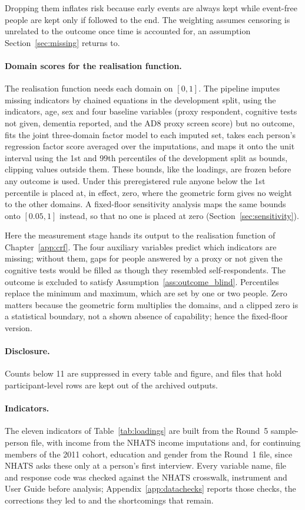 Dropping them inflates risk because early events are always kept while event-free people are kept only if followed to the end. The weighting assumes censoring is unrelated to the outcome once time is accounted for, an assumption Section~\ref{sec:missing} returns to.

\paragraph{Domain scores for the realisation function.} The realisation function needs each domain on $[0,1]$. The pipeline imputes missing indicators by chained equations in the development split, using the indicators, age, sex and four baseline variables (proxy respondent, cognitive tests not given, dementia reported, and the AD8 proxy screen score) but no outcome, fits the joint three-domain factor model to each imputed set, takes each person's regression factor score averaged over the imputations, and maps it onto the unit interval using the 1st and 99th percentiles of the development split as bounds, clipping values outside them. These bounds, like the loadings, are frozen before any outcome is used. Under this preregistered rule anyone below the 1st percentile is placed at, in effect, zero, where the geometric form gives no weight to the other domains. A fixed-floor sensitivity analysis maps the same bounds onto $[0.05,1]$ instead, so that no one is placed at zero (Section~\ref{sec:sensitivity}).

Here the measurement stage hands its output to the realisation function of Chapter~\ref{app:crf}. The four auxiliary variables predict which indicators are missing; without them, gaps for people answered by a proxy or not given the cognitive tests would be filled as though they resembled self-respondents. The outcome is excluded to satisfy Assumption~\ref{ass:outcome_blind}. Percentiles replace the minimum and maximum, which are set by one or two people. Zero matters because the geometric form multiplies the domains, and a clipped zero is a statistical boundary, not a shown absence of capability; hence the fixed-floor version.

\paragraph{Disclosure.} Counts below 11 are suppressed in every table and figure, and files that hold participant-level rows are kept out of the archived outputs.

\paragraph{Indicators.} The eleven indicators of Table~\ref{tab:loadings} are built from the Round~5 sample-person file, with income from the NHATS income imputations and, for continuing members of the 2011 cohort, education and gender from the Round~1 file, since NHATS asks these only at a person's first interview. Every variable name, file and response code was checked against the NHATS crosswalk, instrument and User Guide before analysis; Appendix~\ref{app:datachecks} reports those checks, the corrections they led to and the shortcomings that remain.

